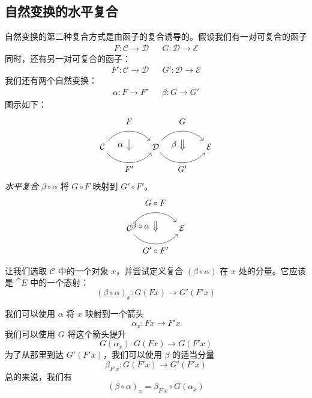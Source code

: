 \documentclass[DaoFP]{subfiles}
\begin{document}
\subsection{自然变换的水平复合}

自然变换的第二种复合方式是由函子的复合诱导的。假设我们有一对可复合的函子
\begin{align*}
 F \colon \mathcal{C} \to \mathcal{D}
&&G \colon \mathcal{D} \to \mathcal{E} 
\end{align*}
同时，还有另一对可复合的函子：
\begin{align*}
 F' \colon \mathcal{C} \to \mathcal{D}
&& G' \colon \mathcal{D} \to \mathcal{E} 
\end{align*}
我们还有两个自然变换：
\begin{align*}
\alpha \colon F \to F'  
&& \beta \colon G \to G' 
\end{align*}
图示如下：
\[
\begin{tikzcd}[column sep=huge]
\mathcal{C}
  \arrow[bend left=50]{r}[name=U, label=above:$F$]{}
  \arrow[bend right=50]{r}[name=D, label=below:$F'$]{} 
 &
\mathcal{D}
  \arrow[bend left=50]{r}[name=U1, label=above:$G$]{}
  \arrow[bend right=50]{r}[name=D1, label=below:$G'$]{} 
 &
\mathcal{E}
  \arrow[shorten <=10pt,shorten >=10pt,Rightarrow,to path={(U) -- node[label=left:$\alpha$] {} (D)}]{}
  \arrow[shorten <=10pt,shorten >=10pt,Rightarrow,to path={(U1) -- node[label=left:$\beta$] {} (D1)}]{}
\end{tikzcd}
\]
\emph{水平复合} $\beta \circ \alpha$ 将 $G \circ F$ 映射到 $G' \circ F'$。
\[
\begin{tikzcd}[column sep=huge]
\mathcal{C}
  \arrow[bend left=50]{r}[name=U, label=above:$G \circ F$]{}
  \arrow[bend right=50]{r}[name=D, label=below:$G' \circ F'$]{} 
 &
\mathcal{E}
  \arrow[shorten <=10pt,shorten >=10pt,Rightarrow,to path={(U) -- node[label=left:$\beta \circ \alpha$] {} (D)}]{}
\end{tikzcd}
\]

让我们选取 $\mathcal{C}$ 中的一个对象 $x$，并尝试定义复合 $(\beta \circ \alpha)$ 在 $x$ 处的分量。它应该是 $\cat E$ 中的一个态射：
\[ (\beta \circ \alpha)_x \colon G ( F x) \to G' ( F' x) \]

我们可以使用 $\alpha$ 将 $x$ 映射到一个箭头
\[ \alpha_x \colon F x \to F' x \]
我们可以使用 $G$ 将这个箭头提升
\[ G (\alpha_x) \colon G (F x) \to G (F' x) \]
为了从那里到达 $G' (F' x)$，我们可以使用 $\beta$ 的适当分量
\[ \beta_{F' x} \colon G (F' x) \to G' (F' x) \]
总的来说，我们有
\[ (\beta \circ \alpha)_x = \beta_{F' x} \circ G (\alpha_x) \]
\end{document}
